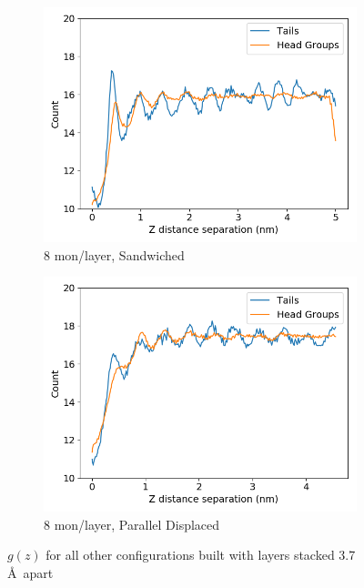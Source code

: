 \documentclass{article}
\begin{document}
\begin{figure}
\begin{subfigure}{0.40\textwidth}
                \includegraphics[width=\textwidth]{zdf_layered_8.png}
                \caption{8 mon/layer, Sandwiched}\label{fig:zdf_layered_8}
        \end{subfigure}
        \begin{subfigure}{0.40\textwidth}
                \centering
                \includegraphics[width=\textwidth]{zdf_offset_8.png}
                \caption{8 mon/layer, Parallel Displaced}\label{fig:zdf_layered_8}
        \end{subfigure}
	\caption{$g(z)$ for all other configurations built with layers stacked 3.7 \AA~apart}\label{fig:zdf}
  \end{figure}
\end{document}
